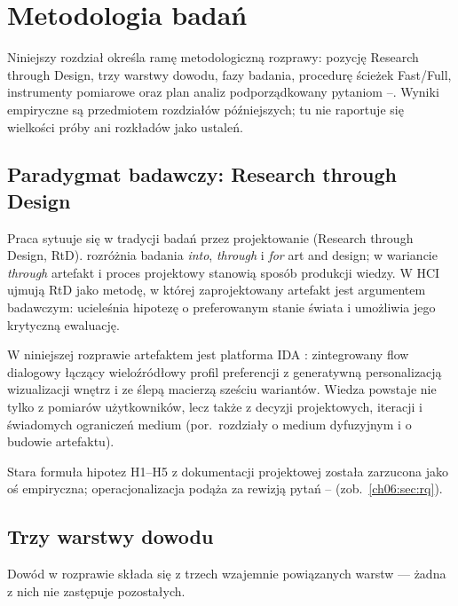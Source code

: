 \chapter{Metodologia badań}
\label{ch06:top}

Niniejszy rozdział określa ramę metodologiczną rozprawy: pozycję Research through Design, trzy warstwy dowodu, fazy badania, procedurę ścieżek Fast/Full, instrumenty pomiarowe oraz plan analiz podporządkowany pytaniom --. Wyniki empiryczne są przedmiotem rozdziałów późniejszych; tu nie raportuje się wielkości próby ani rozkładów jako ustaleń.

\section{Paradygmat badawczy: Research through Design}
\label{ch06:sec:paradygmat}

Praca sytuuje się w tradycji badań przez projektowanie (Research through Design, RtD). \textcite{frayling1993research} rozróżnia badania \emph{into}, \emph{through} i \emph{for} art and design; w wariancie \emph{through} artefakt i proces projektowy stanowią sposób produkcji wiedzy. W HCI \textcite{zimmerman2007rtd} ujmują RtD jako metodę, w której zaprojektowany artefakt jest argumentem badawczym: ucieleśnia hipotezę o preferowanym stanie świata i umożliwia jego krytyczną ewaluację.

W niniejszej rozprawie artefaktem jest platforma IDA \parencite{idaPlatform2026}: zintegrowany flow dialogowy łączący wieloźródłowy profil preferencji z generatywną personalizacją wizualizacji wnętrz i ze ślepą macierzą sześciu wariantów. Wiedza powstaje nie tylko z pomiarów użytkowników, lecz także z decyzji projektowych, iteracji i świadomych ograniczeń medium (por.\ rozdziały o medium dyfuzyjnym i o budowie artefaktu).

Stara formuła hipotez H1--H5 z dokumentacji projektowej została zarzucona jako oś empiryczna; operacjonalizacja podąża za rewizją pytań -- (zob.\ \cref{ch06:sec:rq}).

\section{Trzy warstwy dowodu}
\label{ch06:sec:warstwy}

Dowód w rozprawie składa się z trzech wzajemnie powiązanych warstw --- żadna z nich nie zastępuje pozostałych.

